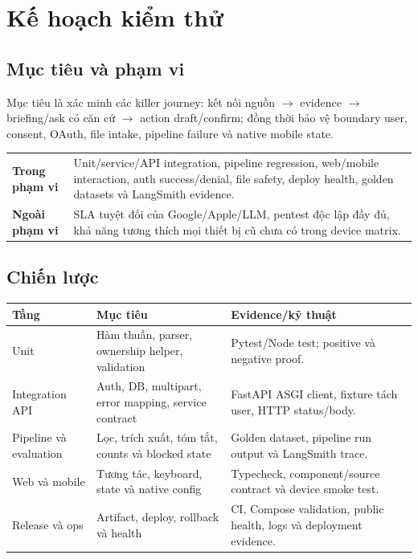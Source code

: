 \documentclass[12pt,a4paper]{article}
\begin{document}
\section{Kế hoạch kiểm thử}
\subsection{Mục tiêu và phạm vi}
Mục tiêu là xác minh các killer journey: kết nối nguồn $\rightarrow$ evidence $\rightarrow$ briefing/ask có căn cứ $\rightarrow$ action draft/confirm; đồng thời bảo vệ boundary user, consent, OAuth, file intake, pipeline failure và native mobile state.

\begin{tabularx}{\textwidth}{>{\bfseries}p{3.1cm}X}
\toprule Trong phạm vi & Unit/service/API integration, pipeline regression, web/mobile interaction, auth success/denial, file safety, deploy health, golden datasets và LangSmith evidence. \\
Ngoài phạm vi & SLA tuyệt đối của Google/Apple/LLM, pentest độc lập đầy đủ, khả năng tương thích mọi thiết bị cũ chưa có trong device matrix. \\
\bottomrule
\end{tabularx}

\subsection{Chiến lược}
\begin{longtable}{p{3cm}p{4cm}p{7cm}}
\toprule Tầng & Mục tiêu & Evidence/kỹ thuật \\ \midrule\endhead
Unit & Hàm thuần, parser, ownership helper, validation & Pytest/Node test; positive và negative proof. \\
Integration API & Auth, DB, multipart, error mapping, service contract & FastAPI ASGI client, fixture tách user, HTTP status/body. \\
Pipeline và evaluation & Lọc, trích xuất, tóm tắt, counts và blocked state & Golden dataset, pipeline run output và LangSmith trace. \\
Web và mobile & Tương tác, keyboard, state và native config & Typecheck, component/source contract và device smoke test. \\
Release và ops & Artifact, deploy, rollback và health & CI, Compose validation, public health, logs và deployment evidence. \\
\bottomrule
\end{longtable}
\end{document}
